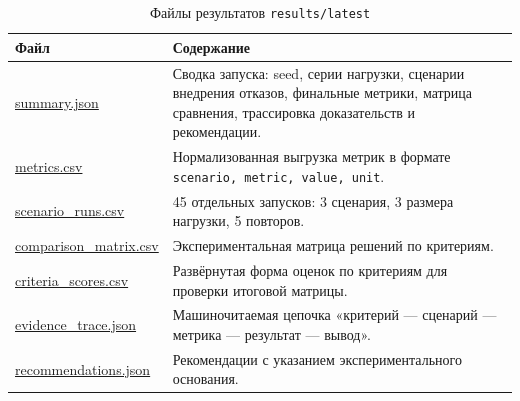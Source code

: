 \documentclass[a4paper,14pt]{extarticle}
\newcommand{\tablefont}{\scriptsize}
\renewcommand{\toprule}{\hline}
\renewcommand{\midrule}{\hline}
\renewcommand{\bottomrule}{\hline}
\numberwithin{figure}{section}
\numberwithin{table}{section}
\begin{document}
\begin{table}[H]
\centering
\caption*{Файлы результатов \texttt{results/latest}}
\tablefont
\setlength{\tabcolsep}{3pt}
\renewcommand{\arraystretch}{1.15}
\begin{tabular}{|L{5.2cm}|L{9.4cm}|}
\toprule
Файл & Содержание \\
\midrule
\url{summary.json} & Сводка запуска: seed, серии нагрузки, сценарии внедрения отказов, финальные метрики, матрица сравнения, трассировка доказательств и рекомендации. \\
\hline
\url{metrics.csv} & Нормализованная выгрузка метрик в формате \texttt{scenario, metric, value, unit}. \\
\hline
\url{scenario_runs.csv} & 45 отдельных запусков: 3 сценария, 3 размера нагрузки, 5 повторов. \\
\hline
\url{comparison_matrix.csv} & Экспериментальная матрица решений по критериям. \\
\hline
\url{criteria_scores.csv} & Развёрнутая форма оценок по критериям для проверки итоговой матрицы. \\
\hline
\url{evidence_trace.json} & Машиночитаемая цепочка «критерий --- сценарий --- метрика --- результат --- вывод». \\
\hline
\url{recommendations.json} & Рекомендации с указанием экспериментального основания. \\
\bottomrule
\end{tabular}
\end{table}
\end{document}
